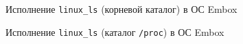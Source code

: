 \begin{figure}[H]
\caption{Исполнение \texttt{linux\_ls} (корневой каталог) в ОС Embox}
\label{fig:embox_ls_root}
\end{figure}

\begin{figure}[H]
\caption{Исполнение \texttt{linux\_ls} (каталог \texttt{/proc}) в ОС Embox}
\label{fig:embox_ls_proc}
\end{figure}

